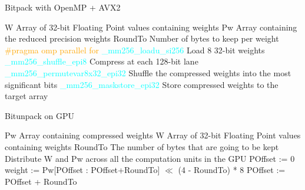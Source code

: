 
\begin{algorithm}%
\caption{Bitpack with OpenMP + AVX2}
\label{alg:bitpack_omp_avx}
{\fontsize{11}{11}\selectfont
\begin{algorithmic}[1]
    \State W
    \Comment Array of 32-bit Floating Point values containing weights
    \State Pw
    \Comment Array containing the reduced precision weights
    \State RoundTo
    \Comment Number of bytes to keep per weight
    \State \textcolor{orange} {\#pragma omp parallel for} %
        \State \textcolor{cyan}{\_mm256\_loadu\_si256}
        \Comment Load 8 32-bit weights 
        \State \textcolor{cyan}{\_mm256\_shuffle\_epi8}
        \Comment Compress at each 128-bit lane
        \State \textcolor{cyan}{\_mm256\_permutevar8x32\_epi32}
        \Comment Shuffle the compressed weights into the most significant bits
        \State \textcolor{cyan}{\_mm256\_maskstore\_epi32}
        \Comment Store compressed weights to the target array
    \EndFor
\end{algorithmic}
}
\end{algorithm}

\begin{algorithm}%
\caption{Bitunpack on GPU}
\label{alg:bitunpack}
{\fontsize{11}{11}\selectfont
\begin{algorithmic}[1]
    \State Pw
    \Comment Array containing compressed weights
    \State W
    \Comment Array of 32-bit Floating Point values containing weights
    \State RoundTo
    \Comment The number of bytes that are going to be kept
    \State Distribute W and Pw across all the computation units in the GPU
        \State POffset := 0
            \State weight := Pw[POffset : POffset+RoundTo] $\ll$ (4 - RoundTo) * 8
            \State POffset := POffset + RoundTo
        \EndFor
    \EndFor
\end{algorithmic}
}
\end{algorithm}

